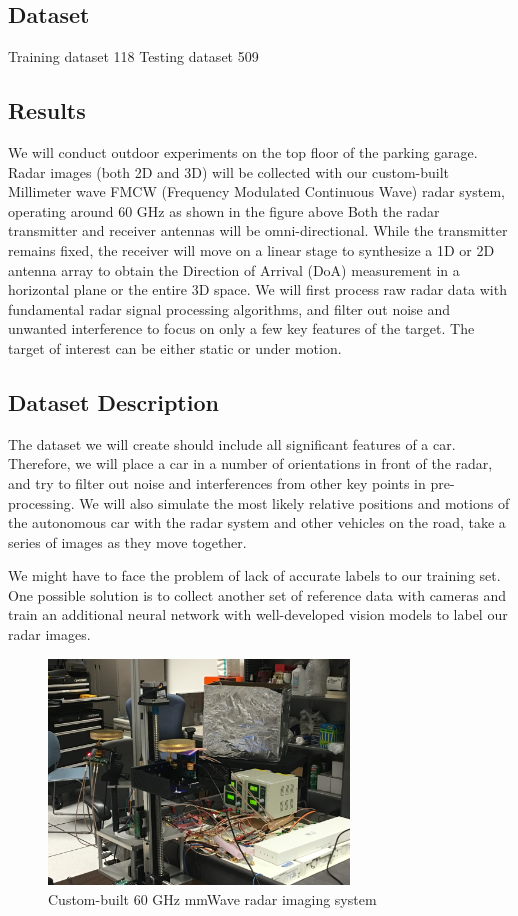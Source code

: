\subsection{}

\subsection{Dataset}
Training dataset 118 
Testing dataset 509

\subsection{Results}


\iffalse
We will conduct outdoor experiments on the top floor of the parking garage. Radar images (both 2D and 3D) will be collected with our custom-built Millimeter wave FMCW (Frequency Modulated Continuous Wave) radar system, operating around 60 GHz as shown in the figure above Both the radar transmitter and receiver antennas will be omni-directional. While the transmitter remains fixed, the receiver will move on a linear stage to synthesize a 1D or 2D antenna array to obtain the Direction of Arrival (DoA) measurement in a horizontal plane or the entire 3D space. We will first process raw radar data with fundamental radar signal processing algorithms, and filter out noise and unwanted interference to focus on only a few key features of the target. The target of interest can be either static or under motion. 

\subsection{Dataset Description}
The dataset we will create should include all significant features of a car. Therefore, we will place a car in a number of orientations in front of the radar, and try to filter out noise and interferences from other key points in pre-processing. We will also simulate the most likely relative positions and motions of the autonomous car with the radar system and other vehicles on the road, take a series of images as they move together.
\par We might have to face the problem of lack of accurate labels to our training set. One possible solution is to collect another set of reference data with cameras and train an additional neural network with well-developed vision models to label our radar images.

\begin{figure}
\centering
\includegraphics[width=8cm,height=6cm]{./figure/experiment_setup.jpg}
\caption{Custom-built 60 GHz mmWave radar imaging system}
\end{figure}

